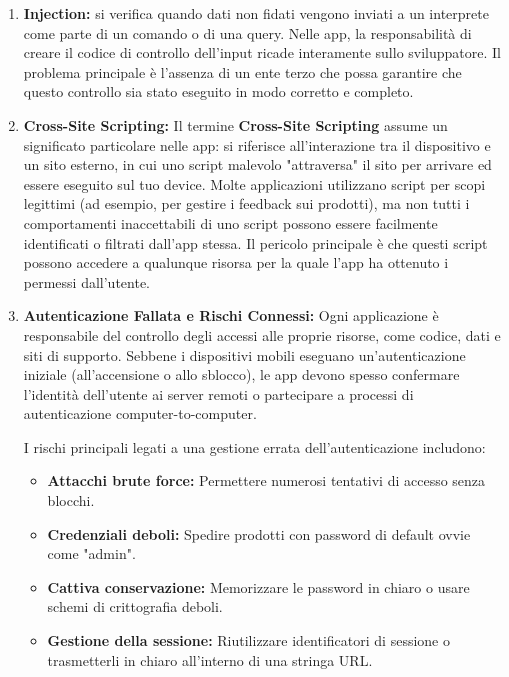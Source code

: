 \documentclass{article}
\begin{document}
\begin{enumerate}
    \item \textbf{Injection:} si verifica quando dati non fidati vengono inviati a un interprete come parte di un comando o di una query. Nelle app, la responsabilità di creare il codice di controllo dell'input ricade interamente sullo sviluppatore. Il problema principale è l'assenza di un ente terzo che possa garantire che questo controllo sia stato eseguito in modo corretto e completo.
    
    \item \textbf{Cross-Site Scripting:} Il termine \textbf{Cross-Site Scripting} assume un significato particolare nelle app: si riferisce all'interazione tra il dispositivo e un sito esterno, in cui uno script malevolo "attraversa" il sito per arrivare ed essere eseguito sul tuo device. Molte applicazioni utilizzano script per scopi legittimi (ad esempio, per gestire i feedback sui prodotti), ma non tutti i comportamenti inaccettabili di uno script possono essere facilmente identificati o filtrati dall'app stessa. Il pericolo principale è che questi script possono accedere a qualunque risorsa per la quale l'app ha ottenuto i permessi dall'utente.
    
    \item \textbf{Autenticazione Fallata e Rischi Connessi:} Ogni applicazione è responsabile del controllo degli accessi alle proprie risorse, come codice, dati e siti di supporto. Sebbene i dispositivi mobili eseguano un'autenticazione iniziale (all'accensione o allo sblocco), le app devono spesso confermare l'identità dell'utente ai server remoti o partecipare a processi di autenticazione computer-to-computer.
    
    I rischi principali legati a una gestione errata dell'autenticazione includono:
    \begin{itemize}
        \item \textbf{Attacchi brute force:} Permettere numerosi tentativi di accesso senza blocchi.
        \item \textbf{Credenziali deboli:} Spedire prodotti con password di default ovvie come "admin".
        \item \textbf{Cattiva conservazione:} Memorizzare le password in chiaro o usare schemi di crittografia deboli.
        \item \textbf{Gestione della sessione:} Riutilizzare identificatori di sessione o trasmetterli in chiaro all'interno di una stringa URL.
    \end{itemize}
    

\end{enumerate}
\end{document}
